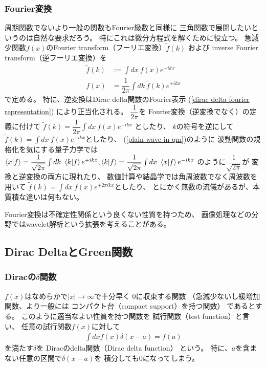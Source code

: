 \subsubsection{Fourier変換}

周期関数でないより一般の関数もFourier級数と同様に
三角関数で展開したいというのは自然な要求だろう。
特にこれは微分方程式を解くために役立つ。
急減少関数$f(x)$のFourier transform（フーリエ変換）$\tilde{f}(k)$
および
inverse Fourier transform（逆フーリエ変換）を
\begin{subequations}
\begin{align}
    \tilde{f}(k)
    &:=
    \int dx\ f(x) e^{-ikx}
\\
    f(x)
    &=
    \dfrac{1}{2\pi}\int dk\ 
    \tilde{f}(k) e^{+ikx}
\end{align}
\end{subequations}
で定める。
特に、逆変換はDirac delta関数のFourier表示
(\ref{dirac delta fourier representation})
により正当化される。
$\dfrac{1}{2\pi}$を
Fourier変換（逆変換でなく）の定義に付けて
$\tilde{f}(k)=\dfrac{1}{2\pi}\int dx\ f(x) e^{-ikx}$
としたり、
$k$の符号を逆にして
$\tilde{f}(k)=\int dx\ f(x) e^{+ikx}$としたり、
(\ref{plain wave in qm})のように
波動関数の規格化を気にする量子力学では
$
    \braket{ x | f }
    =
    \dfrac{1}{\sqrt{2\pi}}
    \int dk\ \braket{k | f} e^{+ikx}
    ,
    \braket{ k | f }
    =
    \dfrac{1}{\sqrt{2\pi}}
    \int dx\ \braket{x | f} e^{-ikx}
$
のように$\dfrac{1}{\sqrt{2\pi}}$が
変換と逆変換の両方に現れたり、
数値計算や結晶学では角周波数でなく周波数を用いて
$\tilde{f}(k)=\int dx\ f(x) e^{+2\pi ikx}$としたり、
とにかく無数の流儀があるが、本質積な違いは何もない。

Fourier変換は不確定性関係という良くない性質を持つため、
画像処理などの分野ではwavelet解析という拡張を考えることがある。

\newpage
\subsection{Dirac DeltaとGreen関数}

\subsubsection{Diracの$\delta$関数}

$f(x)$はなめらかで$|x| \to \infty$で十分早く
$0$に収束する関数
（急減少ないし緩増加関数、より一般には
コンパクト台（compact support）を持つ関数）
であるとする。
このように適当なよい性質を持つ関数を
試行関数（test function）と言い、
任意の試行関数$f(x)$に対して
\begin{align}
    \int dx f(x) \delta(x - a)
    =
    f(a)
\end{align}
を満たす$\delta$を
Diracのdelta関数（Dirac delta function）
という。
特に、$a$を含まない任意の区間で$\delta(x - a)$を
積分しても$0$になってしまう。

